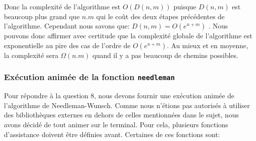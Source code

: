 \documentclass[12pt]{article}
\begin{document}
Donc la complexité de l'algorithme est $O(D(n, m))$ puisque $D(n, m)$ est beaucoup plus grand que $n.m$ qui le coût des deux étapes précédentes de l'algorithme. Cependant nous savons que: $D(n, m) = O(e^{n+m})$ \cite{delannoy_approx}. Nous pouvons donc affirmer avec certitude que la complexité globale de l’algorithme est exponentielle au pire des cas de l’ordre de $O(e^{n + m})$. Au mieux et en moyenne, la complexité sera $\Omega(n.m)$ quand il y a pas beaucoup de chemins possibles.


\subsubsection{Exécution animée de la fonction \texttt{needleman}}
Pour répondre à la question 8, nous devons fournir une exécution animée de l'algorithme de Needleman-Wunsch. Comme nous n'étions pas autorisés à utiliser des bibliothèques externes en dehors de celles mentionnées dans le sujet, nous avons décidé de tout animer sur le terminal.
Pour cela, plusieurs fonctions d'assistance doivent être définies avant. Certaines de ces fonctions sont:
\end{document}

